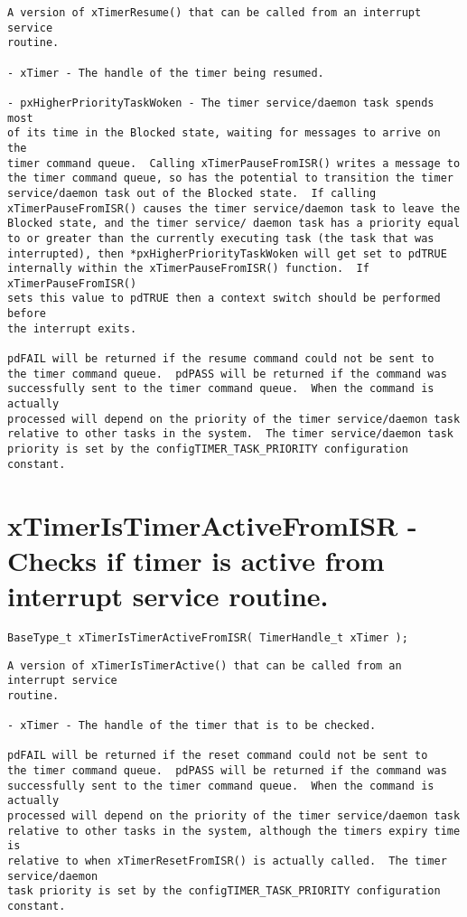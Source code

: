 \begin{lstlisting}
A version of xTimerResume() that can be called from an interrupt service
routine.

- xTimer - The handle of the timer being resumed.

- pxHigherPriorityTaskWoken - The timer service/daemon task spends most
of its time in the Blocked state, waiting for messages to arrive on the
timer command queue.  Calling xTimerPauseFromISR() writes a message to
the timer command queue, so has the potential to transition the timer
service/daemon task out of the Blocked state.  If calling
xTimerPauseFromISR() causes the timer service/daemon task to leave the
Blocked state, and the timer service/ daemon task has a priority equal
to or greater than the currently executing task (the task that was
interrupted), then *pxHigherPriorityTaskWoken will get set to pdTRUE
internally within the xTimerPauseFromISR() function.  If xTimerPauseFromISR()
sets this value to pdTRUE then a context switch should be performed before
the interrupt exits.

pdFAIL will be returned if the resume command could not be sent to
the timer command queue.  pdPASS will be returned if the command was
successfully sent to the timer command queue.  When the command is actually
processed will depend on the priority of the timer service/daemon task
relative to other tasks in the system.  The timer service/daemon task
priority is set by the configTIMER_TASK_PRIORITY configuration constant.

\end{lstlisting}
\section{xTimerIsTimerActiveFromISR -  Checks if timer is active from interrupt service routine.}
\label{rt_cmd:xTimerIsTimerActiveFromISR}

\begin{verbatim}
BaseType_t xTimerIsTimerActiveFromISR( TimerHandle_t xTimer );
\end{verbatim}
\begin{lstlisting}
A version of xTimerIsTimerActive() that can be called from an interrupt service
routine.

- xTimer - The handle of the timer that is to be checked.

pdFAIL will be returned if the reset command could not be sent to
the timer command queue.  pdPASS will be returned if the command was
successfully sent to the timer command queue.  When the command is actually
processed will depend on the priority of the timer service/daemon task
relative to other tasks in the system, although the timers expiry time is
relative to when xTimerResetFromISR() is actually called.  The timer service/daemon
task priority is set by the configTIMER_TASK_PRIORITY configuration constant.

\end{lstlisting}
